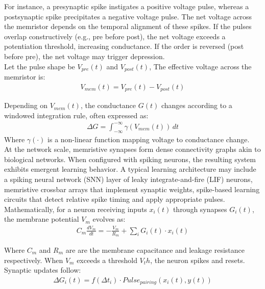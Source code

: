 \noindent For instance, a presynaptic spike instigates a positive voltage pulse, whereas a postsynaptic spike precipitates a negative voltage pulse. The net voltage across the memristor depends on the temporal alignment of these spikes. If the pulses overlap constructively (e.g., pre before post), the net voltage exceeds a potentiation threshold, increasing conductance. If the order is reversed (post before pre), the net voltage may trigger depression. \\

\noindent Let the pulse shape be $V_{pre}(t)$ and $V_{post}(t)$, The effective voltage across the memristor is:
\begin{align}
    V_{mem}(t) = V_{pre}(t) - V_{post}(t) \label{eq:2.34}
\end{align}

\noindent Depending on $ V_{mem}(t)$, the conductance $G(t)$ changes according to a windowed integration rule, often expressed as:
\begin{align}
    \Delta G = \int_{-\infty}^{-\infty} \gamma (V_{mem}(t)) \,dt \label{eq:2.35}
\end{align}
\noindent Where $\gamma(\cdot)$ is a non-linear function mapping voltage to conductance change. \\

\noindent At the network scale, memristive synapses form dense connectivity graphs akin to biological networks. When configured with spiking neurons, the resulting system exhibits emergent learning behavior. A typical learning architecture may include a spiking neural network (SNN) layer of leaky integrate-and-fire (LIF) neurons, memristive crossbar arrays that implement synaptic weights, spike-based learning circuits that detect relative spike timing and apply appropriate pulses.\\

\noindent Mathematically, for a neuron receiving inputs $x_i(t)$ through synapses $G_i(t)$, the membrane potential $V_m$ evolves as:
\begin{align}
    C_m \frac{dV_m}{dt} = -\frac{V_m}{R_m} + \sum_{i} G_i(t) \cdot x_i(t) \label{eq:2.36}
\end{align}

\noindent Where $C_m$ and $R_m$ are are the membrane capacitance and leakage resistance respectively. When $V_m$ exceeds a threshold $V_th$, the neuron spikes and resets. Synaptic updates follow:
\begin{align}
    \Delta G_i(t) = f(\Delta t_i) \cdot Pulse_{pairing}(x_i(t), y(t)) \label{eq:2.37}
\end{align}

